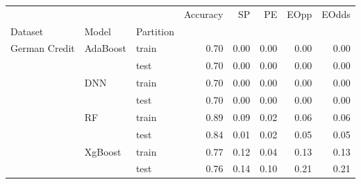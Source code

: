 \begin{tabular}{lllrrrrr}
\toprule
              &         &      &  Accuracy &    SP &    PE &  EOpp &  EOdds \\
Dataset & Model & Partition &           &       &       &       &        \\
\midrule
\multirow{8}{*}{German Credit} & \multirow{2}{*}{AdaBoost} & train &      0.70 &  0.00 &  0.00 &  0.00 &   0.00 \\
              &         & test &      0.70 &  0.00 &  0.00 &  0.00 &   0.00 \\
\cline{2-8}
              & \multirow{2}{*}{DNN} & train &      0.70 &  0.00 &  0.00 &  0.00 &   0.00 \\
              &         & test &      0.70 &  0.00 &  0.00 &  0.00 &   0.00 \\
\cline{2-8}
              & \multirow{2}{*}{RF} & train &      0.89 &  0.09 &  0.02 &  0.06 &   0.06 \\
              &         & test &      0.84 &  0.01 &  0.02 &  0.05 &   0.05 \\
\cline{2-8}
              & \multirow{2}{*}{XgBoost} & train &      0.77 &  0.12 &  0.04 &  0.13 &   0.13 \\
              &         & test &      0.76 &  0.14 &  0.10 &  0.21 &   0.21 \\
\bottomrule
\end{tabular}
